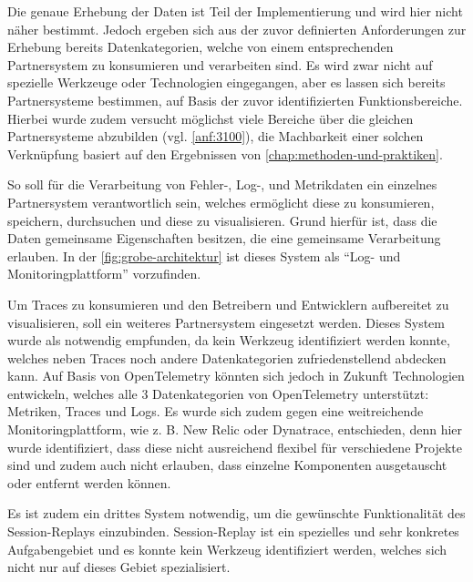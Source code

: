 	 Die genaue Erhebung der Daten ist Teil der Implementierung und wird hier nicht näher bestimmt. Jedoch ergeben sich aus der zuvor definierten Anforderungen zur Erhebung bereits Datenkategorien, welche von einem entsprechenden Partnersystem zu konsumieren und verarbeiten sind. Es wird zwar nicht auf spezielle Werkzeuge oder Technologien eingegangen, aber es lassen sich bereits Partnersysteme bestimmen, auf Basis der zuvor identifizierten Funktionsbereiche. Hierbei wurde zudem versucht möglichst viele Bereiche über die gleichen Partnersysteme abzubilden (vgl. \autoref{anf:3100}), die Machbarkeit einer solchen Verknüpfung basiert auf den Ergebnissen von \autoref{chap:methoden-und-praktiken}.
	 
	 So soll für die Verarbeitung von Fehler-, Log-, und Metrikdaten ein einzelnes Partnersystem verantwortlich sein, welches ermöglicht diese zu konsumieren, speichern, durchsuchen und diese zu visualisieren. Grund hierfür ist, dass die Daten gemeinsame Eigenschaften besitzen, die eine gemeinsame Verarbeitung erlauben. In der \autoref{fig:grobe-architektur} ist dieses System als \enquote{Log- und Monitoringplattform} vorzufinden.
	
	Um Traces zu konsumieren und den Betreibern und Entwicklern aufbereitet zu visualisieren, soll ein weiteres Partnersystem eingesetzt werden. Dieses System wurde als notwendig empfunden, da kein Werkzeug identifiziert werden konnte, welches neben Traces noch andere Datenkategorien zufriedenstellend abdecken kann. Auf Basis von OpenTelemetry könnten sich jedoch in Zukunft Technologien entwickeln, welches alle 3 Datenkategorien von OpenTelemetry unterstützt: Metriken, Traces und Logs. Es wurde sich zudem gegen eine weitreichende Monitoringplattform, wie z. B. New Relic oder Dynatrace, entschieden, denn hier wurde identifiziert, dass diese nicht ausreichend flexibel für verschiedene Projekte sind und zudem auch nicht erlauben, dass einzelne Komponenten ausgetauscht oder entfernt werden können.
	
	Es ist zudem ein drittes System notwendig, um die gewünschte Funktionalität des Session-Replays einzubinden. Session-Replay ist ein spezielles und sehr konkretes Aufgabengebiet und es konnte kein Werkzeug identifiziert werden, welches sich nicht nur auf dieses Gebiet spezialisiert.
	
